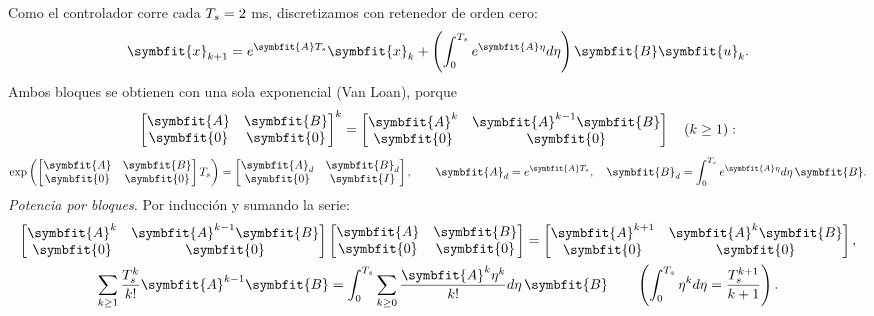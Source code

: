 \documentclass[11pt,a4paper]{article}
\numberwithin{equation}{section}
\newcommand{\vect}[1]{\symbfit{#1}}
\begin{document}
Como el controlador corre cada $T_s = 2$ ms, discretizamos con retenedor de orden cero:
\[
\vect x_{k+1} = e^{\vect AT_s}\vect x_k + \left(\int_0^{T_s}e^{\vect A\eta}d\eta\right)\vect B\vect u_k .
\]
Ambos bloques se obtienen con una sola exponencial (Van Loan), porque
\begin{equation*}
\begin{bmatrix}\vect A & \vect B\\ \vect 0 & \vect 0\end{bmatrix}^k = \begin{bmatrix}\vect A^k & \vect A^{k-1}\vect B\\ \vect 0 & \vect 0\end{bmatrix}\quad(k \ge 1):
\end{equation*}
\begin{equation*}
\exp\left(\begin{bmatrix}\vect A & \vect B\\ \vect 0 & \vect 0\end{bmatrix}T_s\right) = \begin{bmatrix}\vect A_d & \vect B_d\\ \vect 0 & \vect I\end{bmatrix},\qquad \vect A_d = e^{\vect AT_s},\quad \vect B_d = \int_0^{T_s}e^{\vect A\eta}d\eta\,\vect B .
\end{equation*}
\emph{Potencia por bloques.} Por inducción y sumando la serie:
\begin{gather*}
\begin{bmatrix}\vect A^k & \vect A^{k-1}\vect B\\ \vect 0 & \vect 0\end{bmatrix}\begin{bmatrix}\vect A & \vect B\\ \vect 0 & \vect 0\end{bmatrix} = \begin{bmatrix}\vect A^{k+1} & \vect A^k\vect B\\ \vect 0 & \vect 0\end{bmatrix}, \\
\sum_{k\ge1}\frac{T_s^k}{k!}\vect A^{k-1}\vect B = \int_0^{T_s}\sum_{k\ge0}\frac{\vect A^k\eta^k}{k!}d\eta\,\vect B\qquad\left(\int_0^{T_s}\eta^kd\eta = \frac{T_s^{k+1}}{k+1}\right).
\end{gather*}
\end{document}

